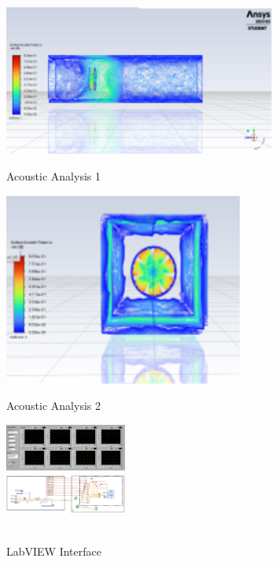 \documentclass[10pt, letterpaper]{article}
\begin{document}
\begin{figure}[!b]
        \vspace{0.1 cm}
        
        \begin{minipage}[c]{0.33\linewidth}
            \centering
            \includegraphics[width=0.8\textwidth]{fig/SGS Intern/Acoustic.png}
            \caption{Acoustic Analysis 1}
        \end{minipage}%
        \begin{minipage}[c]{0.33\linewidth}
            \centering
            \includegraphics[width=0.7\textwidth]{fig/SGS Intern/Acoustic2.png}
            \caption{Acoustic Analysis 2}
        \end{minipage}%
        \begin{minipage}[c]{0.33\linewidth}
            \centering
            \includegraphics[width=4cm]{fig/SGS Intern/labview.png} \\
            \includegraphics[width=4cm]{fig/SGS Intern/labview2.png}
            \caption{\\LabVIEW Interface}
        \end{minipage}
        \vspace{1.8cm} %
    \end{figure}
    
\end{document}
